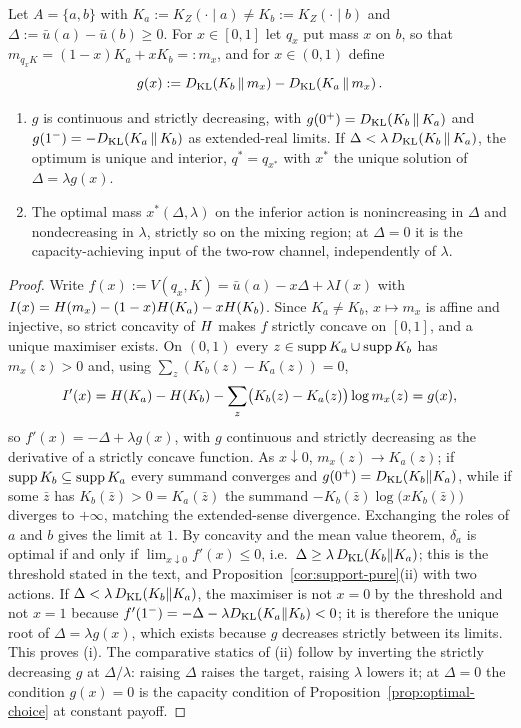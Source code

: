 \begin{proposition}\label{prop:binary}
Let $A=\{a,b\}$ with $K_a:=K_Z(\cdot\mid a)\ne K_b:=K_Z(\cdot\mid b)$ and
$\Delta:=\bar u(a)-\bar u(b)\ge0$.  For $x\in[0,1]$ let $q_x$ put mass $x$ on $b$, so that
$m_{q_xK}=(1-x)K_a+xK_b=:m_x$, and for $x\in(0,1)$ define
\[
 g(x):=D_{\mathrm{KL}}\!\left(K_b\,\middle\|\,m_x\right)-D_{\mathrm{KL}}\!\left(K_a\,\middle\|\,m_x\right).
\]
\begin{enumerate}[label=\textup{(\roman*)},leftmargin=*]
\item $g$ is continuous and strictly decreasing, with $g(0^+)=D_{\mathrm{KL}}(K_b\,\|\,K_a)$ and
$g(1^-)=-D_{\mathrm{KL}}(K_a\,\|\,K_b)$ as extended-real limits.  If $\Delta<\lambda\,D_{\mathrm{KL}}(K_b\,\|\,K_a)$, the optimum is
unique and interior, $q^*=q_{x^*}$ with $x^*$ the unique solution of $\Delta=\lambda g(x)$.
\item The optimal mass $x^*(\Delta,\lambda)$ on the inferior action is nonincreasing in $\Delta$ and
nondecreasing in $\lambda$, strictly so on the mixing region; at $\Delta=0$ it is the capacity-achieving input
of the two-row channel, independently of $\lambda$.
\end{enumerate}
\end{proposition}

\begin{proof}
Write $f(x):=V(q_x,K)=\bar u(a)-x\Delta+\lambda I(x)$ with
$I(x)=H(m_x)-(1-x)H(K_a)-xH(K_b)$.  Since $K_a\ne K_b$,
$x\mapsto m_x$ is affine and injective, so strict concavity of $H$ \cite{CoverThomas2006} makes $f$ strictly
concave on $[0,1]$, and a unique maximiser exists.  On $(0,1)$ every $z\in\operatorname{supp} K_a\cup\operatorname{supp} K_b$ has $m_x(z)>0$
and, using $\sum_z(K_b(z)-K_a(z))=0$,
\[
 I'(x)=H(K_a)-H(K_b)-\sum_z\bigl(K_b(z)-K_a(z)\bigr)\log m_x(z)=g(x),
\]
so $f'(x)=-\Delta+\lambda g(x)$, with $g$ continuous and strictly decreasing as the derivative of a strictly
concave function.  As $x\downarrow0$, $m_x(z)\to K_a(z)$; if $\operatorname{supp} K_b\subseteq\operatorname{supp} K_a$ every summand converges
and $g(0^+)=D_{\mathrm{KL}}(K_b\|K_a)$, while if some $\bar z$ has $K_b(\bar z)>0=K_a(\bar z)$ the summand
$-K_b(\bar z)\log\bigl(xK_b(\bar z)\bigr)$ diverges to $+\infty$, matching the extended-sense divergence.
Exchanging the roles of $a$ and $b$ gives the limit at $1$.  By concavity and the mean value theorem,
$\delta_a$ is optimal if and only if $\lim_{x\downarrow0}f'(x)\le0$, i.e.\ $\Delta\ge\lambda\,D_{\mathrm{KL}}(K_b\|K_a)$;
this is the threshold stated in the text, and Proposition~\ref{cor:support-pure}\textup{(ii)} with two actions.
If $\Delta<\lambda\,D_{\mathrm{KL}}(K_b\|K_a)$, the maximiser is not $x=0$ by the threshold and not $x=1$
because $f'(1^-)=-\Delta-\lambda D_{\mathrm{KL}}(K_a\|K_b)<0$; it is therefore the unique root of $\Delta=\lambda g(x)$, which
exists because $g$ decreases strictly between its limits.  This proves \textup{(i)}.  The comparative statics of
\textup{(ii)} follow by inverting the
strictly decreasing $g$ at $\Delta/\lambda$: raising $\Delta$ raises the target, raising $\lambda$ lowers it; at
$\Delta=0$ the condition $g(x)=0$ is the capacity condition of Proposition~\ref{prop:optimal-choice} at constant
payoff.
\end{proof}

